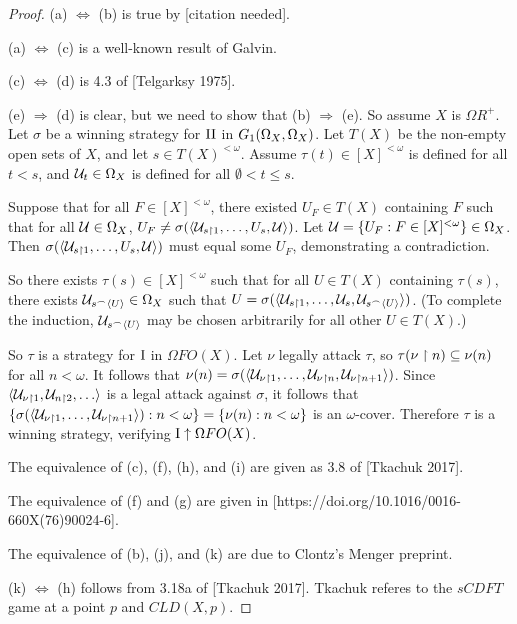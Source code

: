 \documentclass{amsart}
\theoremstyle{plain}
\theoremstyle{definition}
\theoremstyle{remark}
\theoremstyle{plain}
\theoremstyle{definition}
\theoremstyle{remark}
\begin{document}
\begin{proof}
 (a) \(\Leftrightarrow\) (b) is true by [citation needed].

 (a) \(\Leftrightarrow\) (c) is a well-known result of Galvin.

 (c) \(\Leftrightarrow\) (d) is 4.3 of [Telgarksy 1975].
  
 (e) \(\Rightarrow\) (d) is clear, but we need to show that (b) \(\Rightarrow\) (e).
 So assume \(X\) is \(\Omega R^+\). 
 Let \(\sigma\) be a winning strategy for \(\mathrm{II}\) in \(G_{1}(\Omega_X,\Omega_X)\). 
 Let \(T(X)\) be the non-empty open sets of \(X\), and let \(s\in T(X)^{<\omega}\). 
 Assume \(\tau(t)\in[X]^{<\omega}\) is defined for all \(t<s\), and \(\mathcal{U}_t\in\Omega_X\) is defined for all \(\emptyset<t\leq s\). 

 Suppose that for all \(F\in[X]^{<\omega}\), there existed \(U_F\in T(X)\) containing \(F\) such that for all \(\mathcal{U}\in\Omega_X\), \(U_F\not=\sigma(\langle\mathcal{U}_{s\restriction 1},\dots,U_s,\mathcal{U}\rangle)\). 
 Let \(\mathcal{U}=\{U_F:F\in[X]^{<\omega}\}\in\Omega_X\). 
 Then \(\sigma(\langle\mathcal{U}_{s\restriction 1},\dots,U_s,\mathcal{U}\rangle)\) must equal some \(U_F\), demonstrating a contradiction.

 So there exists \(\tau(s)\in[X]^{<\omega}\) such that for all \(U\in T(X)\) containing \(\tau(s)\), there exists \(\mathcal{U}_{s{^\frown}\langle U\rangle}\in\Omega_X\) such that \(U=\sigma(\langle\mathcal{U}_{s\restriction 1},\dots,\mathcal{U}_s,\mathcal{U}_{s{^\frown}\langle U\rangle}\rangle)\). 
 (To complete the induction, \(\mathcal{U}_{s{^\frown}\langle U\rangle}\) may be chosen arbitrarily for all other \(U\in T(X)\).)

 So \(\tau\) is a strategy for \(\mathrm{I}\) in \(\Omega FO(X)\). 
 Let \(\nu\) legally attack \(\tau\), so \(\tau(\nu\restriction n)\subseteq \nu(n)\) for all \(n<\omega\). 
 It follows that \(\nu(n)=\sigma(\langle\mathcal{U}_{\nu\restriction 1},\dots,\mathcal{U}_{\nu\restriction n},\mathcal{U}_{\nu\restriction n+1}\rangle)\). 
 Since \(\<\mc U_{\nu\rest 1},\mc U_{n\rest 2},\dots\>\) is a legal attack against \(\sigma\), it follows that \(\{\sigma(\langle\mathcal{U}_{\nu\restriction 1},\dots,\mathcal{U}_{\nu\restriction n+1}\rangle):n<\omega\}=\{\nu(n):n<\omega\}\) is an \(\omega\)-cover. 
 Therefore \(\tau\) is a winning strategy, verifying \(\mathrm{I}\uparrow\Omega FO(X)\).

 The equivalence of (c), (f), (h), and (i) are given as 3.8 of [Tkachuk 2017].

 The equivalence of (f) and (g) are given in [https://doi.org/10.1016/0016-660X(76)90024-6].
  
 The equivalence of (b), (j), and (k) are due to Clontz's Menger preprint.

 (k) \(\Leftrightarrow\) (h) follows from 3.18a of [Tkachuk 2017].
 Tkachuk referes to the \(sCDFT\) game at a point \(p\) and \(CLD(X,p)\).
\end{proof}
\end{document}
